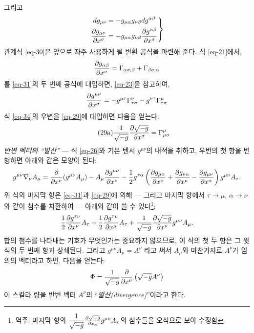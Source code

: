 \documentclass[b5paper]{article}
\begin{document}
그리고
\begin{equation} \label{eq-32}
\left.
\begin{aligned}
dg_{\mu\nu}&=- g_{\mu\alpha} g_{\nu\beta} dg^{\alpha\beta} \\
{\frac{{\partial}{g_{\mu\nu}}}{{\partial}{x^\sigma}}}
&= -g_{\mu\alpha} g_{\nu\beta} {\frac{{\partial}{g^{\alpha\beta}}}{{\partial}{x^\sigma}}}
\end{aligned}
\right\}
\end{equation}
관계식 \eqref{eq-30}은 앞으로 자주 사용하게 될 변환 공식을 마련해 준다.  
식 \eqref{eq-21}에서,
\begin{equation} \label{eq-33}
{\frac{{\partial}{g_{\alpha\beta}}}{{\partial}{x^\sigma}}}=\Gamma_{\alpha\sigma,\beta}+\Gamma_{\beta\sigma,\alpha}
\end{equation}를 \eqref{eq-31}의 두 번째 공식에 대입하면, \eqref{eq-23}을 참고하여,
\begin{equation} \label{eq-34}
{\frac{{\partial}{g^{\mu\nu}}}{{\partial}{x^\sigma}}}
= - g^{\mu\tau} \Gamma_{\tau\sigma}^{\nu} - g^{\nu\tau} \Gamma_{\tau\sigma}^{\mu}
\end{equation}
식 \eqref{eq-34}의 우변을 \eqref{eq-29}에 대입하면 다음을 얻는다.
\begin{equation} \tag{29a} \label{eq-29a}
	\dfrac{1}{\sqrt{-g}}{\frac{{\partial}{\sqrt{-g}}}{{\partial}{x^\sigma}}}
	=\Gamma_{\mu\sigma}^\mu 
\end{equation}
\emph{반변 벡터의 ``발산''} ---
식 \eqref{eq-26}와 기본 텐서 $g^{\mu\nu}$의 내적을 취하고, 우변의 첫 항을 변형하면 아래와 같은 모양이 된다:
\begin{equation*}
	g^{\mu\nu} \nabla_\nu A_\mu = {\frac{{\partial}{}}{{\partial}{x^\nu}}}(g^{\mu\nu}A_\mu)
	- A_\mu {\frac{{\partial}{g^{\mu\nu}}}{{\partial}{x^\nu}}}
	- \frac{1}{2}g^{\tau\alpha}\left(
	{\frac{{\partial}{g_{\mu\alpha}}}{{\partial}{x^\nu}}}
	+ {\frac{{\partial}{g_{\nu\alpha}}}{{\partial}{x^\mu}}}
	- {\frac{{\partial}{g_{\mu\nu}}}{{\partial}{x^\alpha}}}
	\right) g^{\mu\nu} A_\tau .
\end{equation*}
위 식의 마지막 항은 \eqref{eq-31}과 \eqref{eq-29}에 의해 --- 그리고 마지막 항에서 $\tau\rightarrow\mu$, $\alpha\rightarrow\nu$ 와 같이 첨수를 치환하여 --- 아래와 같이 쓸 수 있다\footnote{역주: 마지막 항의 $\dfrac{1}{\sqrt{-g}}{\frac{{\partial}{\sqrt{-g}}}{{\partial}{x_\alpha}}} g^{\mu\nu} A_\tau $의 첨수들을 오식으로 보아 수정함}:
\begin{equation*}
	\frac{1}{2} {\frac{{\partial}{g^{\tau\nu}}}{{\partial}{x^\nu}}} A_\tau
	+ \frac{1}{2} {\frac{{\partial}{g^{\tau\mu}}}{{\partial}{x^\mu}}} A_\tau
	+ \dfrac{1}{\sqrt{-g}}{\frac{{\partial}{\sqrt{-g}}}{{\partial}{x^\nu}}} g^{\mu\nu} A_\mu .
\end{equation*}
합의 첨수를 나타내는 기호가 무엇인가는 중요하지 않으므로, 이 식의 첫 두 항은 그 윗 식의 두 번째 항과 상쇄된다. 그리고 $ g^{\mu\nu}A_\mu=A^\nu $ 라고 써서 $ A_\mu $와 마찬가지로 $ A^\nu $가 임의의 벡터라고 하면, 다음을 얻는다:
\begin{equation} \label{eq-35}
	\Phi = \dfrac{1}{\sqrt{-g}}{\frac{{\partial}{}}{{\partial}{x^\nu}}} \left( \sqrt{-g} A^\nu \right)
\end{equation}
이 스칼라 량을 반변 벡터 $A^\nu$의 ``\emph{발산(divergence)}''이라고 한다.
\end{document}
